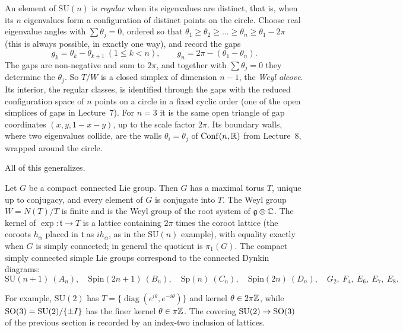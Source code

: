 \begin{remark}
An element of $\mathrm{SU}(n)$ is \emph{regular} when its eigenvalues are distinct, that is, when its
$n$ eigenvalues form a configuration of distinct points on the circle. Choose real eigenvalue angles with
$\sum\theta_j=0$, ordered so that $\theta_1\ge\theta_2\ge\dots\ge\theta_n\ge\theta_1-2\pi$ (this is
always possible, in exactly one way), and record the gaps
\[
  g_k=\theta_k-\theta_{k+1}\ (1\le k<n),\qquad g_n=2\pi-(\theta_1-\theta_n).
\]
The gaps are non-negative and sum to $2\pi$, and together with $\sum\theta_j=0$ they determine the
$\theta_j$. So $T/W$ is a closed simplex of dimension $n-1$, the \emph{Weyl alcove}. Its interior, the
regular classes, is identified through the gaps with the reduced configuration space of $n$ points on a
circle in a fixed cyclic order (one of the open simplices of gaps in Lecture~7). For $n=3$ it is the same open triangle of gap coordinates $(x,y,1-x-y)$, up to the scale
factor $2\pi$. Its boundary walls, where two eigenvalues collide, are the walls $\theta_i=\theta_j$ of
$\operatorname{Conf}(n,\mathbb{R})$ from Lecture~8, wrapped around the circle.
\end{remark}

All of this generalizes.

\begin{theorem}\label{LIE:thm:torus}
Let $G$ be a compact connected Lie group. Then $G$ has a maximal torus $T$, unique up to conjugacy,
and every element of $G$ is conjugate into $T$. The Weyl group $W=N(T)/T$ is finite and is the Weyl
group of the root system of $\mathfrak g\otimes\mathbb{C}$. The kernel of $\exp\colon\mathfrak t\to T$ is a lattice
containing $2\pi$ times the coroot lattice (the coroots $h_\alpha$ placed in $\mathfrak t$ as $ih_\alpha$,
as in the $\mathrm{SU}(n)$ example), with equality exactly when $G$ is simply connected; in general the
quotient is $\pi_1(G)$. The
compact simply connected simple Lie groups correspond to the connected Dynkin diagrams:
\[
  \mathrm{SU}(n+1)\ (A_n),\quad \mathrm{Spin}(2n+1)\ (B_n),\quad \mathrm{Sp}(n)\ (C_n),\quad
  \mathrm{Spin}(2n)\ (D_n),\quad G_2,\ F_4,\ E_6,\ E_7,\ E_8 .
\]
\end{theorem}

For example, $\mathrm{SU}(2)$ has $T=\{\operatorname{diag}(e^{i\theta},e^{-i\theta})\}$ and kernel
$\theta\in2\pi\mathbb{Z}$, while $\mathrm{SO}(3)=\mathrm{SU}(2)/\{\pm I\}$ has the finer kernel $\theta\in\pi\mathbb{Z}$. The covering
$\mathrm{SU}(2)\to\mathrm{SO}(3)$ of the previous section is recorded by an index-two inclusion of lattices.

